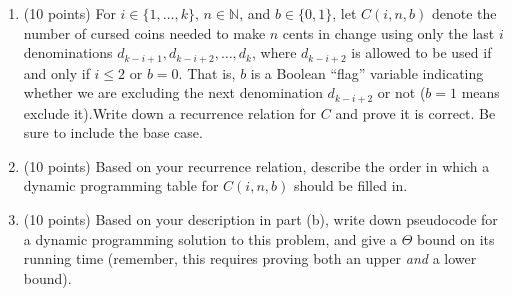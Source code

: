 \documentclass[12pt]{article}
\begin{document}
\begin{enumerate}
\begin{enumerate}
\item \label{3a} (10 points) For $i \in \{1,\dotsc,k\}$, $n \in \mathbb{N}$, and $b \in \{0,1\}$, let
    $C(i,n,b)$ denote the number of cursed coins needed to make $n$ cents in
    change using only the last $i$ denominations $d_{k-i+1}, d_{k-i+2}, \dotsc, d_k$,
    where $d_{k-i+2}$ is allowed to be used if and only if $i \leq 2$ or
    $b=0$. That is, $b$ is a Boolean ``flag'' variable indicating whether
    we are excluding the next denomination $d_{k-i+2}$ or not ($b=1$ means exclude
    it).Write down a recurrence relation for $C$ and prove it is
    correct. Be sure to include the base case.
\pagebreak
	
\item \label{3b} (10 points) Based on your recurrence relation, describe the order in
    which a dynamic programming table for $C(i,n,b)$ should be filled in.
\pagebreak
	
\item \label{3c} (10 points) Based on your description in part (b), write down pseudocode for a
    dynamic programming solution to this problem, and give a $\Theta$ bound on
    its running time (remember, this requires proving both an upper
    \emph{and} a lower bound).
\pagebreak
\end{enumerate}
	
	

\end{enumerate}
\end{document}
